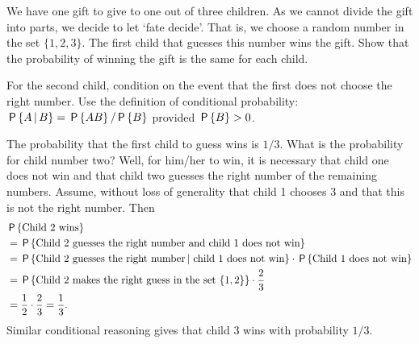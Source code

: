 \documentclass[queueing_book]{subfiles}
\begin{document}
\begin{exercise}\label{ex:l-109}
 We have one gift to give to one out of three children. As we cannot
 divide the gift into parts, we decide to let `fate decide'. That
 is, we choose a random number in the set $\{1, 2, 3\}$. The first
 child that guesses this number wins the gift. Show that the
 probability of winning the gift is the same for each child.
\begin{hint}
 For the second child, condition on the event that the first does not choose the right number.
 Use the definition of conditional probability:
 $\P{A\given B} = \P{AB}/\P{B}$ provided $\P{B}>0$.
\end{hint}
\begin{solution}
 The probability that the first child to guess  wins is
 $1/3$. What is the probability for child number two? Well, for
 him/her to win, it is necessary that child one does not win and
 that child two guesses the right number of the remaining
 numbers. Assume, without loss of generality that child 1 chooses
 $3$ and that this is not the right number. Then 
 \begin{equation*}
 \begin{split}
&\P{\text{Child 2 wins}} \\
&= \P{\text{Child 2 guesses the right number and child 1 does not win}} \\
&= \P{\text{Child 2 guesses the right number} \given\, \text{child 1 does not win}}
\cdot \P{\text{Child 1 does not win}} \\
&= \P{\text{Child 2 makes the right guess in the set $\{1,2\}$}}\cdot \frac 23 \\
&= \frac 1 2\cdot \frac 23 = \frac 1 3.
 \end{split}
 \end{equation*}
 Similar conditional reasoning gives that child 3 wins with probability $1/3$. 
\end{solution}
\end{exercise}


\end{document}
